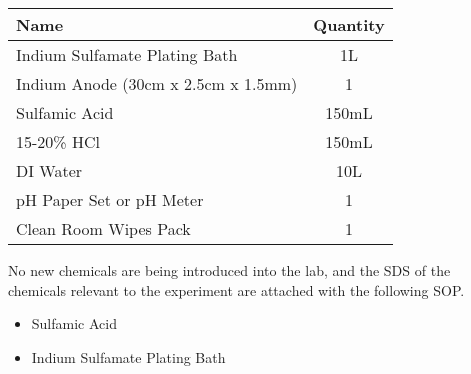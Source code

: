 \begin{center}
\begin{framed}
\begin{minipage}{0.8\textwidth}
\begin{center}
            \vspace{0.5cm}

            \begin{tabular}{|l|c|}
                \hline
                \textbf{Name} & \textbf{Quantity} \\
                \hline
                Indium Sulfamate Plating Bath        & 1L \\
                Indium Anode (30cm x 2.5cm x 1.5mm)  & 1 \\
                Sulfamic Acid                        & 150mL \\
                15-20\% HCl                          & 150mL \\
                DI Water                             & 10L \\
                pH Paper Set or pH Meter             & 1 \\
                Clean Room Wipes Pack                & 1 \\
                \hline
            \end{tabular}

            \end{center}


            No new chemicals are being introduced into the lab, and the SDS of the chemicals relevant to the experiment are attached with the following SOP.

            \begin{itemize}
                \item Sulfamic Acid
                \item Indium Sulfamate Plating Bath
            \end{itemize}

        \end{minipage}
    \end{framed}
\end{center}


